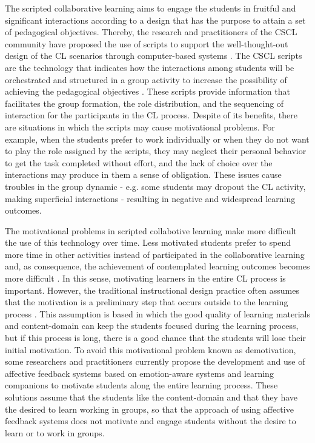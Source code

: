 The scripted collaborative learning aims to engage the students in fruitful and significant interactions according to a design that has the purpose to attain a set of pedagogical objectives.
Thereby, the research and practitioners of the CSCL community have proposed the use of scripts to support the well-thought-out design of the CL scenarios through computer-based systems \cite{FischerKollarStegmannWeckerZottmann2013,KobbeWeinbergerDillenbourgHarrerHamalainenHakkinenFischer2007}.
The CSCL scripts are the technology that indicates how the interactions among students will be orchestrated and structured in a group activity to increase the possibility of achieving the pedagogical objectives \cite{WeinbergerErtlFischerMandl2005}. These scripts provide information that facilitates the group formation, the role distribution, and the sequencing of interaction for the participants in the CL process.
Despite of its benefits, there are situations in which the scripts may cause motivational problems.
For example, when the students prefer to work individually or when they do not want to play the role assigned by the scripts, they may neglect their personal behavior to get the task completed without effort, and the lack of choice over the interactions may produce in them a sense of obligation.
These issues cause troubles in the group dynamic - e.g. some students may dropout the CL activity, making superficial interactions - resulting in negative and widespread learning outcomes.

The motivational problems in scripted collabotive learning make more difficult the use of this technology over time.
Less motivated students prefer to spend more time in other activities instead of participated in the collaborative learning and, as consequence, the achievement of contemplated learning outcomes becomes more difficult \cite{Crook2000, FaloutElwoodHood2009, SchoorBannert2011}.
In this sense, motivating learners in the entire CL process is important.
However, the traditional instructional design practice often assumes that the motivation is a preliminary step that occurs outside to the learning process \cite{ChanAhern1999, Keller1987}.
This assumption is based in which the good quality of learning materials and content-domain can keep the students focused during the learning process, but if this process is long, there is a good chance that the students will lose their initial motivation.
To avoid this motivational problem known as demotivation, some researchers and practitioners currently propose the development and use of affec\cite{FeidakisDaradoumisCaballeConesa2014,FeidakisCaballeDaradoumisJimenezConesa2014}tive feedback systems base\cite{WoolfBurlesonArroyoDragonCooperPicard2009}d on emotion-aware systems and learning companions to motivate students along the entire learning process.
These solutions assume that the students like the content-domain and that they have the desired to learn working in groups, so that the approach of using affective feedback systems does not motivate and engage students without the desire to learn or to work in groups.

